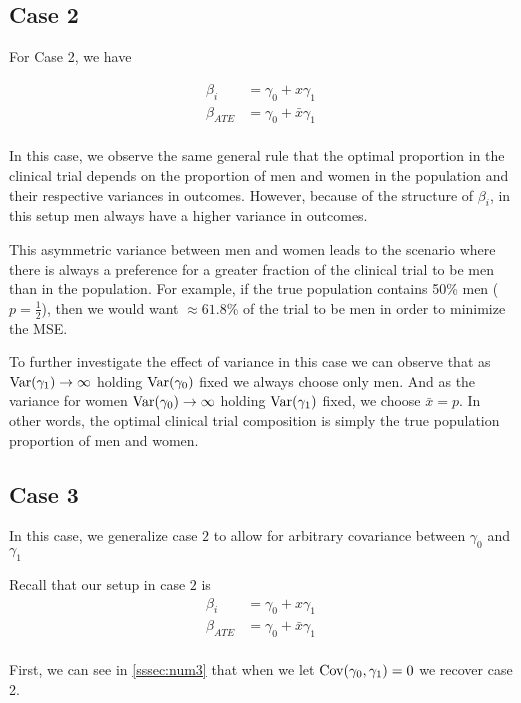 \subsection*{Case 2}

For Case 2, we have 

\begin{align*}
	\beta_i &=  \gamma_0 + x \gamma_1 \\
	\beta_{ATE} &=  \gamma_0 + \bar{x} \gamma_1 \\
\end{align*}


In this case, we observe the same general rule that the optimal proportion in the clinical trial depends on the proportion of men and women in the population and their respective variances in outcomes.
However, because of the structure of $\beta_ i$, in this setup men always have a higher variance in outcomes.

This asymmetric variance between men and women leads to the scenario where there is always a preference for a greater fraction of the clinical trial to be men than in the population. 
For example, if the true population contains 50\% men ($p = \frac{1}{2}$), then we would want $\approx 61.8 \%$ of the trial to be men in order to minimize the MSE.

To further investigate the effect of variance in this case we can observe that as $\mathrm{Var}(\gamma_1) \to \infty$ holding $\mathrm{Var}(\gamma_0)$ fixed we always choose only men.
And as the variance for women $\mathrm{Var}(\gamma_0) \to \infty$ holding $\mathrm{Var}(\gamma_1)$ fixed, we choose $\bar{x} = p$. In other words, the optimal clinical trial composition is simply the true population proportion of men and women.

\subsection*{Case 3}

In this case, we generalize case $2$ to allow for arbitrary covariance between $\gamma_0$ and $\gamma_1$

Recall that our setup in case  $2$ is
\begin{align*}
	\beta_i &=  \gamma_0 + x \gamma_1 \\
	\beta_{ATE} &=  \gamma_0 + \bar{x} \gamma_1 \\
\end{align*}

First, we can see in \ref{sssec:num3} that when we let  $\mathrm{Cov}(\gamma_0, \gamma_1) = 0$ we recover case 2.

